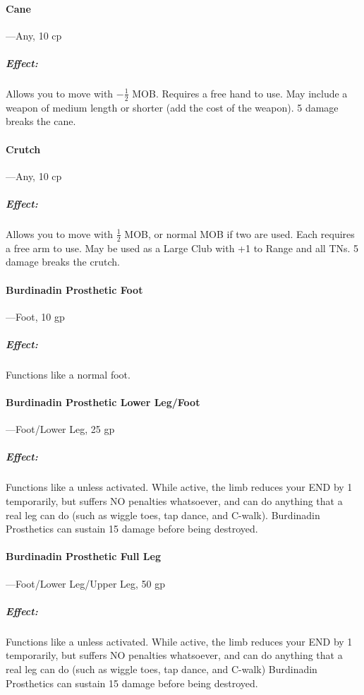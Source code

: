 \documentclass[oneside,11pt,english]{book}
\begin{document}
\paragraph{Cane}---\quad Any, 10 cp
\vspace{-15pt} \subparagraph{Effect:} Allows you to move with $ -\frac{1}{2} $ MOB. Requires a free hand to use. May include a weapon of medium length or shorter (add the cost of the weapon). 5 damage breaks the cane.

\paragraph{Crutch}---\quad Any, 10 cp
\vspace{-15pt} \subparagraph{Effect:} Allows you to move with $ \frac{1}{2} $ MOB, or normal MOB if two are used. Each requires a free arm to use. May be used as a Large Club with +1 to Range and all TNs. 5 damage breaks the crutch.

\paragraph{Burdinadin Prosthetic Foot}---\quad Foot, 10 gp
\vspace{-15pt} \subparagraph{Effect:} Functions like a normal foot.

\paragraph{Burdinadin Prosthetic Lower Leg/Foot}---\quad Foot/Lower Leg, 25 gp
\vspace{-15pt} \subparagraph{Effect:} Functions like a 
unless activated. While active, the limb reduces your END by 1 temporarily, but
suffers NO penalties whatsoever, and can do anything that a real leg can do
(such as wiggle toes, tap dance, and C-walk). Burdinadin Prosthetics can sustain
15 damage before being destroyed.  

\paragraph{Burdinadin Prosthetic Full Leg}---\quad Foot/Lower Leg/Upper Leg, 50 gp
\vspace{-15pt} \subparagraph{Effect:} Functions like a 
unless activated. While active, the limb reduces your END by 1 temporarily, but
suffers NO penalties whatsoever, and can do anything that a real leg can do
(such as wiggle toes, tap dance, and C-walk) Burdinadin Prosthetics can sustain
15 damage before being destroyed. 
\end{document}
